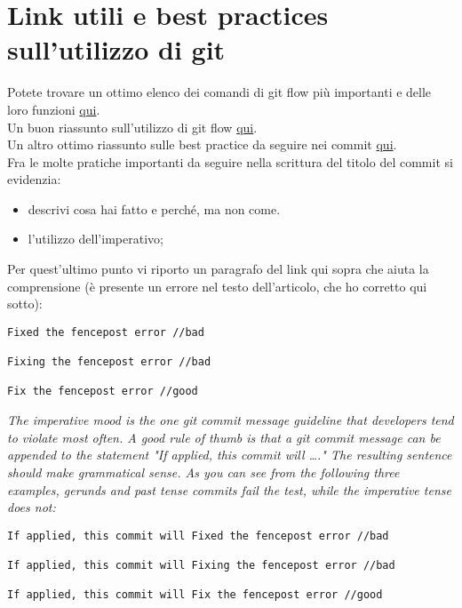 \section{Link utili e best practices sull'utilizzo di git}
Potete trovare un ottimo elenco dei comandi di git flow più importanti e delle loro funzioni
\href{https://danielkummer.github.io/git-flow-cheatsheet/}{qui}. \\
Un buon riassunto sull'utilizzo di git flow \href{https://www.atlassian.com/git/tutorials/comparing-workflows/gitflow-workflow}{qui}.\\
Un altro ottimo riassunto sulle best practice da seguire nei commit \href{https://www.theserverside.com/video/Follow-these-git-commit-message-guidelines}{qui}. \\
Fra le molte pratiche importanti da seguire nella scrittura del titolo del commit si evidenzia:
\begin{itemize}
\item descrivi cosa hai fatto e perch\'{e}, ma non come.
\item l'utilizzo dell'imperativo;
\end{itemize}
Per quest'ultimo punto vi riporto un paragrafo del link qui sopra che aiuta la comprensione (è presente un errore nel testo dell'articolo, che ho corretto qui sotto):
\begin{lstlisting}
Fixed the fencepost error //bad

Fixing the fencepost error //bad

Fix the fencepost error //good
\end{lstlisting}
\textit{The imperative mood is the one git commit message guideline that developers tend to violate most often. A good rule of thumb is that a git commit message can be appended to the statement "If applied, this commit will …." The resulting sentence should make grammatical sense. As you can see from the following three examples, gerunds and past tense commits fail the test, while the imperative tense does not:}
\begin{lstlisting}
If applied, this commit will Fixed the fencepost error //bad

If applied, this commit will Fixing the fencepost error //bad

If applied, this commit will Fix the fencepost error //good
\end{lstlisting}
